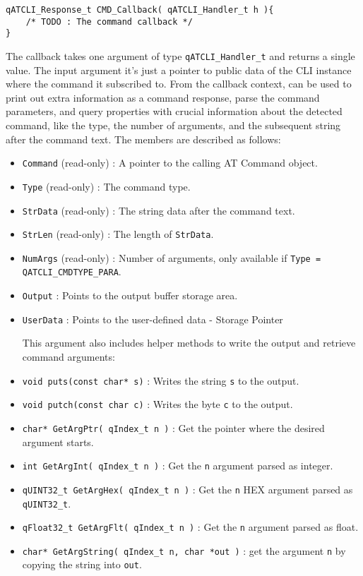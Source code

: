 \begin{lstlisting}[style=CStyle]
qATCLI_Response_t CMD_Callback( qATCLI_Handler_t h ){
    /* TODO : The command callback */
}
\end{lstlisting}

The callback takes one argument of type \lstinline{qATCLI_Handler_t} and returns a single value.
\medskip
The input argument it's just a pointer to public data of the CLI instance where the command it subscribed to. From the callback context, can be used to print out extra information as a command response, parse the command parameters, and query properties with crucial information about the detected command, like the type, the number of arguments, and the subsequent string after the command text. The members are described as follows:

\begin{itemize}
    \item \lstinline{Command} (read-only) : A pointer to the calling AT Command object.
    \item \lstinline{Type} (read-only) : The command type.
    \item \lstinline{StrData} (read-only) : The string data after the command text.
    \item \lstinline{StrLen} (read-only) : The length of \lstinline{StrData}.
    \item \lstinline{NumArgs} (read-only) : Number of arguments, only available if \lstinline{Type = QATCLI_CMDTYPE_PARA}.
    \item \lstinline{Output} : Points to the output buffer storage area.
    \item \lstinline{UserData} : Points to the user-defined data - Storage Pointer
    
    This argument also includes helper methods to write the output and retrieve command arguments:
    
    \item \lstinline{void puts(const char* s)} : Writes the string \lstinline{s} to the output.
    \item \lstinline{void putch(const char c)} : Writes the byte \lstinline{c} to the output.
    \item \lstinline{char* GetArgPtr( qIndex_t n )} : Get the pointer where the desired argument starts.
    \item \lstinline{int GetArgInt( qIndex_t n )} : Get the \lstinline{n} argument parsed as integer.
    \item \lstinline{qUINT32_t GetArgHex( qIndex_t n )} : Get the \lstinline{n} HEX argument parsed as \lstinline{qUINT32_t}.
    \item \lstinline{qFloat32_t GetArgFlt( qIndex_t n )} : Get the \lstinline{n} argument parsed as float.
    \item \lstinline{char* GetArgString( qIndex_t n, char *out )} :  get the argument \lstinline{n} by copying the string into \lstinline{out}.
\end{itemize}

